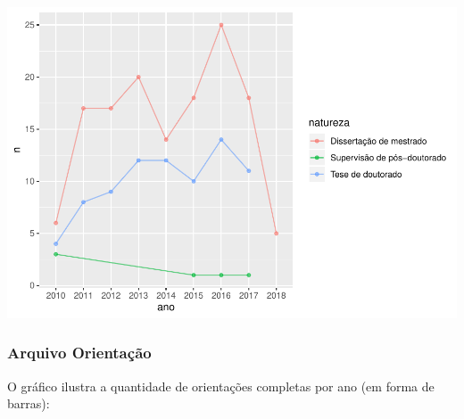 \documentclass[]{article}
\begin{document}
\includegraphics{LuanFreitas.relatorio2_files/figure-latex/unnamed-chunk-90-1.pdf}

\hypertarget{arquivo-orientauxe7uxe3o-1}{%
\subsubsection{Arquivo Orientação}\label{arquivo-orientauxe7uxe3o-1}}

O gráfico ilustra a quantidade de orientações completas por ano (em
forma de barras):
\end{document}
